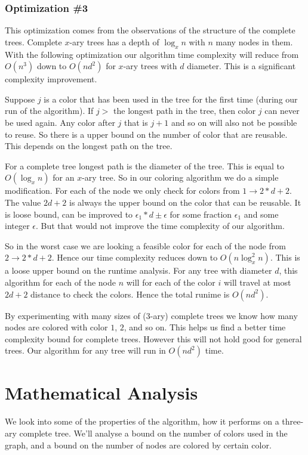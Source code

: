 \documentclass{article}
\theoremstyle{remark}
\begin{document}
\subsubsection{Optimization \#3}
This optimization comes from the observations of the structure of the complete trees. Complete $x$-ary trees has a depth of $\log_{x} n$ with $n$ many nodes in them. With the following optimization our algorithm time complexity will reduce from $O(n^3)$ down to $O(n d^2)$ for $x$-ary trees with $d$ diameter. This is a significant complexity improvement.

Suppose $j$ is a color that has been used in the tree for the first time (during our run of the algorithm). If $j >$ the longest path in the tree, then color $j$ can never be used again. Any color after $j$ that is $j + 1$ and so on will also not be possible to reuse. So there is a upper bound on the number of color that are reusable. This depends on the longest path on the tree.

For a complete tree longest path is the diameter of the tree. This is equal to $O(\log_{x} n)$ for an $x$-ary tree. So in our coloring algorithm we do a simple modification. For each of the node we only check for colors from $1 \to 2*d+2$. The value $2d+2$ is always the upper bound on the color that can be reusable. It is loose bound, can be improved to $\epsilon_1*d \pm \epsilon$ for some fraction $\epsilon_1$ and some integer $\epsilon$. But that would not improve the time complexity of our algorithm.

So in the worst case we are looking a feasible color for each of the node from $2 \to 2*d+2$. Hence our time complexity reduces down to $O(n \log_x^2 n)$. This is a loose upper bound on the runtime analysis. For any tree with diameter $d$, this algorithm for each of the node $n$ will for each of the color $i$ will travel at most $2d + 2$ distance to check the colors. Hence the total runime is $O(nd^2)$.

By experimenting with many sizes of (3-ary) complete trees we know how many nodes are colored with color $1$, $2$, and so on. This helps us find a better time complexity bound for complete trees. However this will not hold good for general trees. Our algorithm for any tree will run in $O(nd^2)$ time.

\section{Mathematical Analysis}

We look into some of the properties of the algorithm, how it performs on a three-ary complete tree. We'll analyse a bound on the number of colors used in the graph, and a bound on the number of nodes are colored by certain color.
\end{document}

